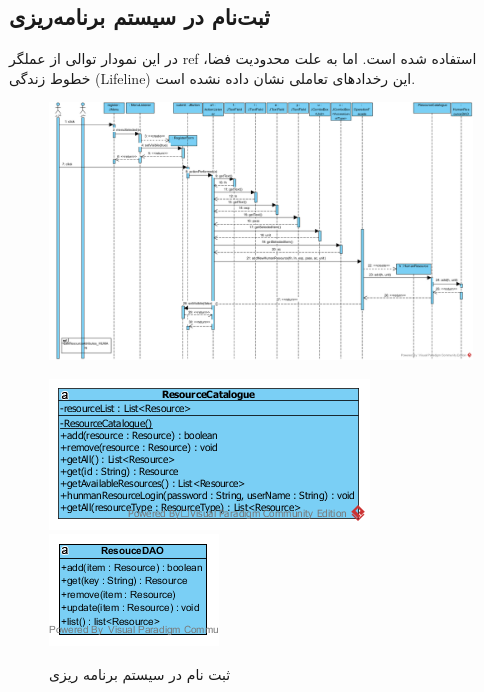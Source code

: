 \begin{landscape}
\section{ثبت‌نام در سیستم برنامه‌ریزی}
در این نمودار توالی از عملگر ref استفاده شده است. اما به علت محدودیت فضا، خطوط زندگی (Lifeline) این رخدادهای تعاملی نشان داده نشده است.
\begin{figure}[H]
	\centering
	\includegraphics[scale=0.6]{img/sequence-design/SignUp}
\end{figure}
\begin{figure}[H]
	\centering
	\includegraphics[scale=0.7]{img/sequence-design/SignUpC}
	\includegraphics[scale=0.7]{img/sequence-design/SignUpD}
	\caption{ثبت نام در سیستم برنامه ریزی}
\end{figure}
\end{landscape}

